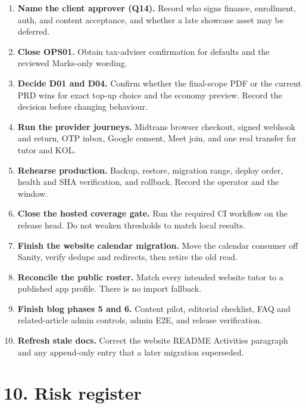 \documentclass[11pt,a4paper]{article}
\begin{document}
\begin{enumerate}
	\item \textbf{Name the client approver (Q14).} Record who signs finance, enrollment, auth, and content acceptance, and whether a late showcase asset may be deferred.
	\item \textbf{Close OPS01.} Obtain tax-adviser confirmation for defaults and the reviewed Marks-only wording.
	\item \textbf{Decide D01 and D04.} Confirm whether the final-scope PDF or the current PRD wins for exact top-up choice and the economy preview. Record the decision before changing behaviour.
	\item \textbf{Run the provider journeys.} Midtrans browser checkout, signed webhook and return, OTP inbox, Google consent, Meet join, and one real transfer for tutor and KOL.
	\item \textbf{Rehearse production.} Backup, restore, migration range, deploy order, health and SHA verification, and rollback. Record the operator and the window.
	\item \textbf{Close the hosted coverage gate.} Run the required CI workflow on the release head. Do not weaken thresholds to match local results.
	\item \textbf{Finish the website calendar migration.} Move the calendar consumer off Sanity, verify dedupe and redirects, then retire the old read.
	\item \textbf{Reconcile the public roster.} Match every intended website tutor to a published app profile. There is no import fallback.
	\item \textbf{Finish blog phases 5 and 6.} Content pilot, editorial checklist, FAQ and related-article admin controls, admin E2E, and release verification.
	\item \textbf{Refresh stale docs.} Correct the website README Activities paragraph and any append-only entry that a later migration superseded.
\end{enumerate}

\section{10. Risk register}
\end{document}
